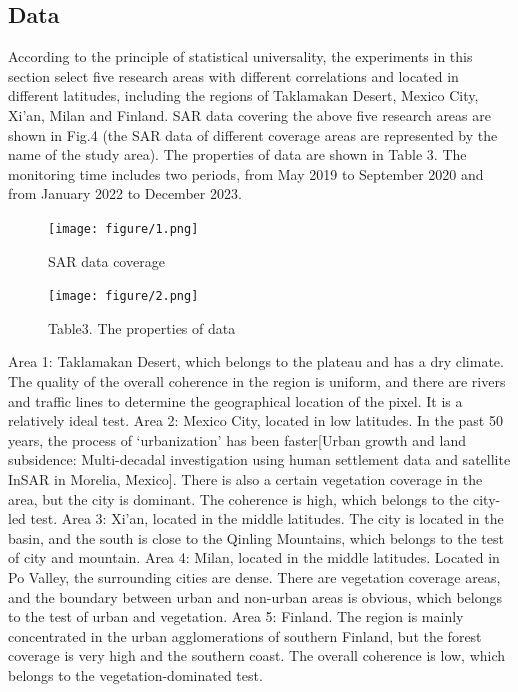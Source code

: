 \documentclass[a4paper,fleqn]{cas-dc}
\begin{document}
\subsection{Data}
According to the principle of statistical universality, the experiments in this section select five research areas with different correlations and located in different latitudes, including the regions of Taklamakan Desert, Mexico City, Xi’an, Milan and Finland. SAR data covering the above five research areas are shown in Fig.4 (the SAR data of different coverage areas are represented by the name of the study area). The properties of data are shown in Table 3. The monitoring time includes two periods, from May 2019 to September 2020 and from January 2022 to December 2023. \par
\begin{figure}
	\centering 
	\texttt{[image: figure/1.png]}	
	\caption{SAR data coverage} 
	\label{fig_4}
\end{figure}
\begin{figure}
	\centering 
	\texttt{[image: figure/2.png]}	
	\caption{Table3. The properties of data} 
	\label{fig_5}
\end{figure}
Area 1: Taklamakan Desert, which belongs to the plateau and has a dry climate. The quality of the overall coherence in the region is uniform, and there are rivers and traffic lines to determine the geographical location of the pixel. It is a relatively ideal test. Area 2: Mexico City, located in low latitudes. In the past 50 years, the process of ‘urbanization’ has been faster[Urban growth and land subsidence: Multi-decadal investigation using human settlement data and satellite InSAR in Morelia, Mexico]. There is also a certain vegetation coverage in the area, but the city is dominant. The coherence is high, which belongs to the city-led test. Area 3: Xi’an, located in the middle latitudes. The city is located in the basin, and the south is close to the Qinling Mountains, which belongs to the test of city and mountain. Area 4: Milan, located in the middle latitudes. Located in Po Valley, the surrounding cities are dense. There are vegetation coverage areas, and the boundary between urban and non-urban areas is obvious, which belongs to the test of urban and vegetation. Area 5: Finland. The region is mainly concentrated in the urban agglomerations of southern Finland, but the forest coverage is very high and the southern coast. The overall coherence is low, which belongs to the vegetation-dominated test. \par
\end{document}
